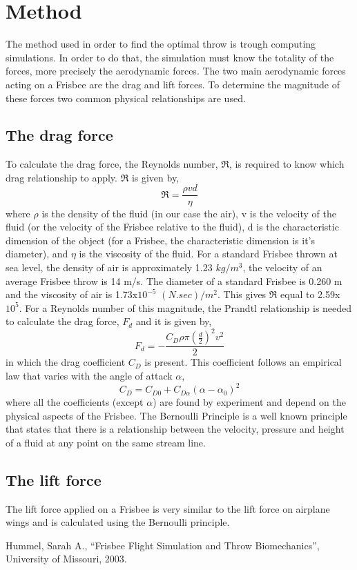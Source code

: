 \documentclass[10pt,a4paper]{report}
\begin{document}
\section{Method}
The method used in order to find the optimal throw is trough computing simulations. In order to do that, the simulation must know the totality of the forces, more precisely the aerodynamic forces. The two main aerodynamic forces acting on a Frisbee are the drag and lift forces. To determine the magnitude of these forces two common physical relationships are used.

\subsection{The drag force}
To calculate the drag force, the Reynolds number, $\Re$, is required to know which drag relationship to apply. $\Re$ is given by,
\[\Re = \frac{\rho v d}{\eta}\]
where $\rho$ is the density of the fluid (in our case the air), v is the velocity of the fluid (or the velocity of the Frisbee relative to the fluid), d is the characteristic dimension of the object (for a Frisbee, the characteristic dimension is it’s diameter), and $\eta$ is the viscosity of the fluid. For a standard Frisbee thrown at sea level, the density of air is approximately 1.23 $kg/m^3$, the velocity of an average Frisbee throw is 14 m/s. The diameter of a standard Frisbee is 0.260 m and the viscosity of air is 1.73x$10^{-5}$ $(N.sec)/m^2$. This gives $\Re$ equal to 2.59x$10^5$. For a Reynolds number of this magnitude, the Prandtl relationship is needed to calculate the drag force, $F_d$ and it is given by,
\[F_d = - \frac{C_D \rho \pi \left(\frac{d}{2}\right)^2 v^2}{2}\]
in which the drag coefficient $C_D$ is present. This coefficient follows an empirical law\cite{art1} that varies with the angle of attack $\alpha$,
\[C_D = C_{D0} + C_{D\alpha}(\alpha-\alpha_0)^2\]
where all the coefficients (except $\alpha$) are found by experiment and depend on the physical aspects of the Frisbee. The Bernoulli Principle is a well known principle that states that there is a relationship between the velocity, pressure and height of a fluid at any point on the same stream line.

\subsection{The lift force}

The lift force applied on a Frisbee is very similar to the lift force on
airplane wings and is calculated using the Bernoulli principle.

\begin{thebibliography}{9}

  Hummel, Sarah A.,
  “Frisbee Flight Simulation and Throw Biomechanics”,
  University of Missouri,
  2003.

\end{thebibliography}
\end{document}
